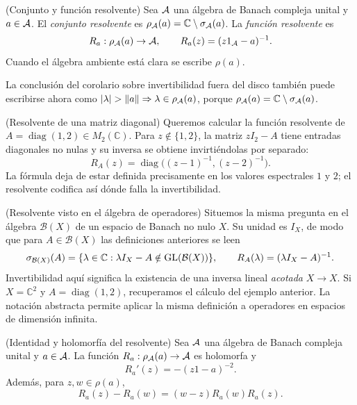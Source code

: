 \begin{cthdefinicion}{(Conjunto y función resolvente)}
Sea $\mathcal A$ una álgebra de Banach compleja unital y $a\in\mathcal A$.
El \emph{conjunto resolvente} es $\rho_\mathcal A(a)=\mathbb C\setminus\sigma_\mathcal A(a)$.
La \emph{función resolvente} es
\[
 R_a:\rho_\mathcal A(a)\to\mathcal A,\qquad R_a(z)=(z1_\mathcal A-a)^{-1}.
\]
Cuando el álgebra ambiente está clara se escribe $\rho(a)$.
\end{cthdefinicion}

\noindent La conclusión del corolario sobre invertibilidad fuera del disco
también puede escribirse ahora como
$|\lambda|>\|a\|\Rightarrow\lambda\in\rho_\A(a)$, porque
$\rho_\mathcal A(a)=\mathbb C\setminus\sigma_\mathcal A(a)$.

\begin{cthejemplo}{(Resolvente de una matriz diagonal)}
Queremos calcular la función resolvente de
$A=\operatorname{diag}(1,2)\in M_2(\mathbb C)$.
Para $z\notin\{1,2\}$, la matriz $zI_2-A$ tiene entradas diagonales
no nulas y su inversa se obtiene invirtiéndolas por separado:
\[
 R_A(z)=\operatorname{diag}\bigl((z-1)^{-1},(z-2)^{-1}\bigr).
\]
La fórmula deja de estar definida precisamente en los valores
espectrales $1$ y $2$; el resolvente codifica así dónde falla la
invertibilidad.
\end{cthejemplo}

\begin{cthejemplo}{(Resolvente visto en el álgebra de operadores)}
Situemos la misma pregunta en el álgebra $\mathcal B(X)$ de un espacio
de Banach no nulo $X$. Su unidad es $I_X$, de modo que para
$A\in\mathcal B(X)$ las definiciones anteriores se leen
\[
 \sigma_{\mathcal B(X)}(A)
 =\{\lambda\in\mathbb C:\lambda I_X-A\notin\operatorname{GL}(\mathcal B(X))\},
 \qquad R_A(\lambda)=(\lambda I_X-A)^{-1}.
\]
Invertibilidad aquí significa la existencia de una inversa lineal
\emph{acotada} $X\to X$. Si $X=\mathbb C^2$ y
$A=\operatorname{diag}(1,2)$, recuperamos el cálculo del ejemplo
anterior. La notación abstracta permite aplicar la misma definición
a operadores en espacios de dimensión infinita.
\end{cthejemplo}

\begin{cthlema}{(Identidad y holomorfía del resolvente)}
Sea $\mathcal A$ una álgebra de Banach compleja unital y $a\in\mathcal A$.
La función $R_a:\rho_\mathcal A(a)\to\mathcal A$ es holomorfa y
\[
 R_a'(z)=-(z1-a)^{-2}.
\]
Además, para $z,w\in\rho(a)$,
\[
 R_a(z)-R_a(w)=(w-z)R_a(w)R_a(z).
\]
\end{cthlema}

